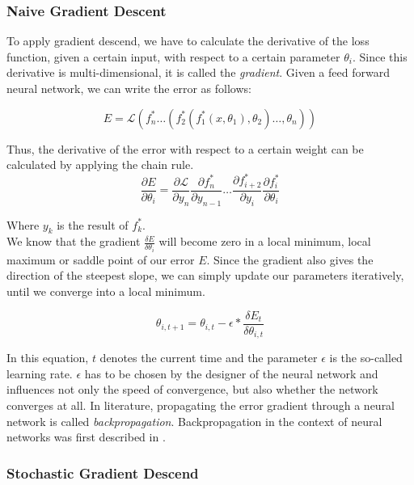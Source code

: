\subsubsection{Naive Gradient Descent}
\label{sec:gradient_descend}
To apply gradient descend, we have to calculate the derivative of the loss function, given a certain input, with respect to a certain parameter $\theta_i$. Since this derivative is multi-dimensional, it is called the \textit{gradient}. Given a feed forward neural network, we can write the error as follows:

\[
E = \mathcal{L}(f^*_n \dots (f^*_2(f^*_1(x, \theta_1), \theta_2) \dots, \theta_n))
\]

Thus, the derivative of the error with respect to a certain weight can be calculated by applying the chain rule.
\[
\frac{\partial E}{\partial \theta_i} = 
	\frac{\partial \mathcal{L}}{\partial y_n}
	\frac{\partial f^*_n}{\partial y_{n - 1}}
	\dots
	\frac{\partial f^*_{i + 2}}{\partial y_i}
	\frac{\partial f^*_i}{\partial \theta_i}
\]

Where $y_k$ is the result of $f^*_k$. \\
We know that the gradient $\frac{\delta E}{\delta \theta_i}$ will become zero in a local minimum, local maximum or saddle point of our error $E$. Since the gradient also gives the direction of the steepest slope, we can simply update our parameters iteratively, until we converge into a local minimum.

\[
	\theta_{i, t+1} = \theta_{i, t} - \epsilon * \frac{\delta E_{t}}{\delta \theta_{i, t}}
\]

In this equation, $t$ denotes the current time and the parameter $\epsilon$ is the so-called learning rate. $\epsilon$ has to be chosen by the designer of the neural network and influences not only the speed of convergence, but also whether the network converges at all. In literature, propagating the error gradient through a neural network is called \textit{backpropagation}. Backpropagation in the context of neural networks was first described in \cite{werbos1974beyond}.

\subsubsection{Stochastic Gradient Descend}

